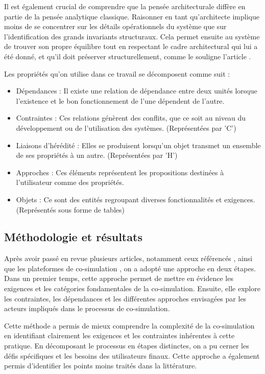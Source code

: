 Il est également crucial de comprendre que la pensée architecturale diffère en partie de la pensée analytique classique. Raisonner en tant qu'architecte implique moins de se concentrer sur les détails opérationnels du système que sur l'identification des grands invariants structuraux. Cela permet ensuite au système de trouver son propre équilibre tout en respectant le cadre architectural qui lui a été donné, et qu'il doit préserver structurellement, comme le souligne l'article \cite{b26}.

Les propriétés qu'on utilise dans ce travail se décomposent comme suit :
\begin{itemize}
  \item Dépendances : Il existe une relation de dépendance entre deux unités lorsque l'existence et le bon fonctionnement de l'une dépendent de l'autre.
  \item Contraintes : Ces relations génèrent des conflits, que ce soit au niveau du développement ou de l'utilisation des systèmes. (Représentées par 'C')
  \item Liaisons d'hérédité : Elles se produisent lorsqu'un objet transmet un ensemble de ses propriétés à un autre. (Représentées par 'H')
  \item Approches : Ces éléments représentent les propositions destinées à l'utilisateur comme des propriétés.
  \item Objets : Ce sont des entités regroupant diverses fonctionnalités et exigences. (Représentés sous forme de tables)
\end{itemize}
\subsection{Méthodologie et résultats}
Après avoir passé en revue plusieurs articles, notamment ceux référencés \cite{b7,b8,b9,b10,b11,b12}, ainsi que les plateformes de co-simulation \cite{b13,b14,b15,b16,b17,b18,b19}, on a adopté une approche en deux étapes. Dans un premier temps, cette approche permet de mettre en évidence les exigences et les catégories fondamentales de la co-simulation. Ensuite, elle explore les contraintes, les dépendances et les différentes approches envisagées par les acteurs impliqués dans le processus de co-simulation.

Cette méthode a permis de mieux comprendre la complexité de la co-simulation en identifiant clairement les exigences et les contraintes inhérentes à cette pratique. En décomposant le processus en étapes distinctes, on a pu cerner les défis spécifiques et les besoins des utilisateurs finaux. Cette approche a également permis d'identifier les points moins traités dans la littérature.

